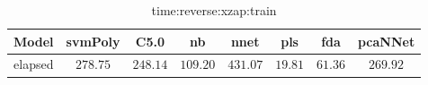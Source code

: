 \begin{table}[!ht]
	\centering
	\begin{tabular}{|c|c|c|c|c|c|c|c|}
		\hline
		Model & svmPoly & C5.0 & nb & nnet & pls & fda & pcaNNet \\ \hline
		elapsed & $278.75$ & $248.14$ & $109.20$ & $431.07$ & $19.81$ & $61.36$ & $269.92$ \\ \hline
	\end{tabular}
	\caption{time:reverse:xzap:train}
	\label{tab:time:reverse:xzap:train}
\end{table}
